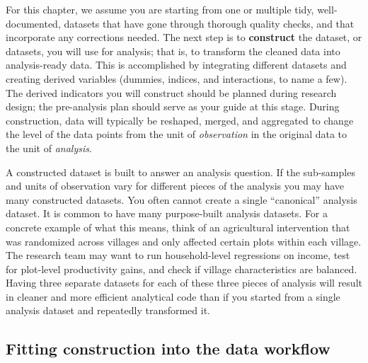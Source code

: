 For this chapter, we assume you are starting from one or multiple tidy,\cite{hadley2017R}
well-documented, datasets that have gone through thorough quality checks,
and that incorporate any corrections needed.
The next step is to \textbf{construct}
the dataset, or datasets, you will use for analysis;
that is, to transform the cleaned data into analysis-ready data.
This is accomplished by integrating different datasets and creating derived variables 
(dummies, indices, and interactions, to name a few).
The derived indicators you will construct should be
planned during research design;
the pre-analysis plan should serve as your guide at this stage.
During construction, data will typically be 
reshaped, merged, and aggregated to change the level of the data points
from the unit of \textit{observation} in the original data 
to the unit of \textit{analysis}.

A constructed dataset is built to answer an analysis question.
If the sub-samples and units of observation vary for different pieces of the analysis
you may have many constructed datasets.
You often cannot create a single ``canonical'' analysis dataset.
It is common to have many purpose-built analysis datasets.
For a concrete example of what this means,
think of an agricultural intervention that was randomized across villages
and only affected certain plots within each village.
The research team may want to run household-level regressions on income,
test for plot-level productivity gains,
and check if village characteristics are balanced.
Having three separate datasets for each of these three pieces of analysis
will result in cleaner and more efficient analytical code than if 
you started from a single analysis dataset and repeatedly transformed it.

\subsection{Fitting construction into the data workflow}

